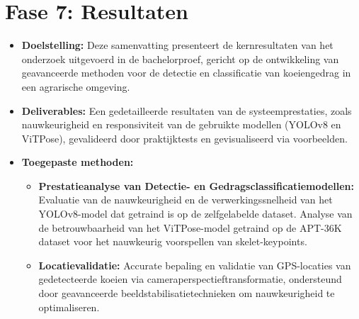 \section{Fase 7: Resultaten}
\begin{itemize}
\item \textbf{Doelstelling:} Deze samenvatting presenteert de kernresultaten van het onderzoek uitgevoerd in de bachelorproef, gericht op de ontwikkeling van geavanceerde methoden voor de detectie en classificatie van koeiengedrag in een agrarische omgeving.

\item \textbf{Deliverables:} Een gedetailleerde resultaten van de systeemprestaties, zoals nauwkeurigheid en responsiviteit van de gebruikte modellen (YOLOv8 en ViTPose), gevalideerd door praktijktests en gevisualiseerd via voorbeelden.

\item \textbf{Toegepaste methoden:}
    \begin{itemize}
        \item \textbf{Prestatieanalyse van Detectie- en Gedragsclassificatiemodellen:} Evaluatie van de nauwkeurigheid en de verwerkingssnelheid van het YOLOv8-model dat getraind is op de zelfgelabelde dataset. Analyse van de betrouwbaarheid van het ViTPose-model getraind op de APT-36K dataset voor het nauwkeurig voorspellen van skelet-keypoints.
        \item \textbf{Locatievalidatie:} Accurate bepaling en validatie van GPS-locaties van gedetecteerde koeien via cameraperspectieftransformatie, ondersteund door geavanceerde beeldstabilisatietechnieken om nauwkeurigheid te optimaliseren.
    \end{itemize}
\end{itemize}

